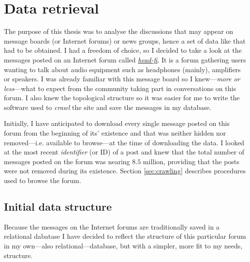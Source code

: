 \section{Data retrieval}

  The purpose of this thesis was to analyse the discussions that may appear on message boards (or Internet forums) or news groups, hence a set of data like that had to be obtained. I had a freedom of choice, so I decided to take a look at the messages posted on an Internet forum called \emph{\href{http://www.head-fi.org/f/}{head-fi}}. It is a forum gathering users wanting to talk about audio equipment such as headphones (mainly), amplifiers or speakers. I was already familiar with this message board so I knew---\textit{more or less}---what to expect from the community taking part in conversations on this forum. I also knew the topological structure so it was easier for me to write the software used to \emph{crawl} the site and save the messages in my database.
  
  Initially, I have anticipated to download every single message posted on this forum from the beginning of its' existence and that was neither hidden nor removed---i.e. available to browse---at the time of downloading the data. I looked at the most recent \emph{identifier} (or ID) of a post and knew that the total number of messages posted on the forum was nearing $8.5$ million, providing that the posts were not removed during its existence. Section \ref{sec:crawling} describes procedures used to browse the forum.
  
  \subsection{Initial data structure}
    Because the messages on the Internet forums are traditionally saved in a relational dabatase I have decided to reflect the structure of this particular forum in my own---also relational---database, but with a simpler, more fit to my needs, structure.
    
